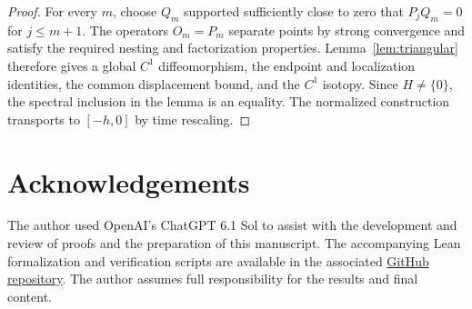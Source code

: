 \documentclass[11pt]{article}
\begin{document}
\begin{proof}
For every $m$, choose $Q_m$ supported sufficiently close to
zero that $P_jQ_m=0$ for $j\le m+1$. The operators $O_m=P_m$
separate points by strong convergence and satisfy the required
nesting and factorization properties. Lemma~\ref{lem:triangular}
therefore gives a global $C^1$ diffeomorphism, the
endpoint and localization identities, the common displacement
bound, and the $C^1$ isotopy. Since $H\ne\{0\}$, the spectral
inclusion in the lemma is an equality. The normalized
construction transports to $[-h,0]$ by time rescaling.
\end{proof}

\section*{Acknowledgements}

The author used OpenAI's ChatGPT 6.1 Sol
to assist with the development and review of
proofs and the preparation of this manuscript. The accompanying Lean formalization and verification
scripts are available in the associated
\href{https://github.com/kemae0/global-straightening-of-solution-manifolds}
{GitHub repository}.
The author assumes full responsibility for
the results and final content.
\end{document}

